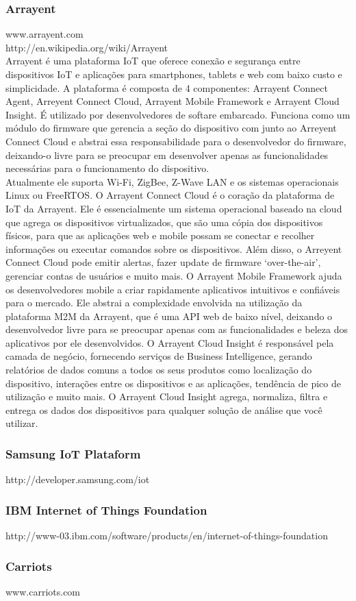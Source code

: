 \subsubsection{Arrayent}
www.arrayent.com\\
http://en.wikipedia.org/wiki/Arrayent\\
Arrayent \cite{arrayent} é uma plataforma IoT que oferece conexão e segurança entre dispositivos IoT e aplicações para  smartphones, tablets e web com baixo custo e simplicidade. A plataforma é composta de 4 componentes: Arrayent Connect Agent, Arreyent Connect Cloud, Arrayent Mobile Framework e Arrayent Cloud Insight.
É utilizado por desenvolvedores de softare embarcado. Funciona como um módulo do firmware que gerencia a seção do dispositivo com junto ao Arreyent Connect Cloud e abstrai essa responsabilidade para o desenvolvedor do firmware, deixando-o livre para se preocupar em desenvolver apenas as funcionalidades necessárias para o funcionamento do dispositivo.\\
Atualmente ele suporta Wi-Fi, ZigBee, Z-Wave LAN e os sistemas operacionais Linux ou FreeRTOS.
O Arrayent Connect Cloud é o coração da plataforma de IoT da Arrayent. Ele é essencialmente um sistema operacional baseado na cloud que agrega os dispositivos virtualizados, que são uma cópia dos dispositivos físicos,  para que as aplicações web e mobile possam se conectar e recolher informações ou executar comandos sobre os dispositivos. Além disso, o Arreyent Connect Cloud pode emitir alertas, fazer update de firmware \lq over-the-air\rq, gerenciar contas de usuários e muito mais.
O Arrayent Mobile Framework ajuda os desenvolvedores mobile a criar rapidamente aplicativos intuitivos e confiáveis para o mercado. Ele abstrai a complexidade envolvida na utilização da plataforma M2M da Arrayent, que é uma API web de baixo nível, deixando o desenvolvedor livre para se preocupar apenas com as funcionalidades e beleza dos aplicativos por ele desenvolvidos.
O Arrayent Cloud Insight é responsável pela camada de negócio, fornecendo serviços de Business Intelligence, gerando relatórios de dados comuns a todos os seus produtos como localização do dispositivo, interações entre os dispositivos e as aplicações, tendência de pico de utilização e muito mais. O Arrayent Cloud Insight agrega, normaliza, filtra e entrega os dados dos dispositivos para qualquer solução de análise que você utilizar.

\subsubsection{Samsung IoT Plataform}
http://developer.samsung.com/iot \\

\subsubsection{IBM Internet of Things Foundation}
http://www-03.ibm.com/software/products/en/internet-of-things-foundation \\

\subsubsection{Carriots}
www.carriots.com\\
